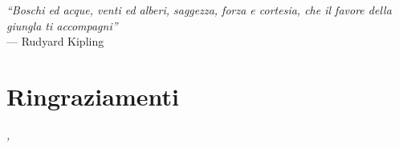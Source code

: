 
\cleardoublepage
{}
{}

\begin{flushright}{ %
	\slshape
	``Boschi ed acque, venti ed alberi, saggezza, forza e cortesia, che il favore della giungla ti accompagni''} \\
	\medskip
    --- Rudyard Kipling
\end{flushright}


\bigskip

\begingroup
\let\clearpage\relax
\let\cleardoublepage\relax
\let\cleardoublepage\relax

\chapter*{Ringraziamenti}



\bigskip

\noindent\textit{\myLocation, \myTime}
\hfill \myName

\endgroup
